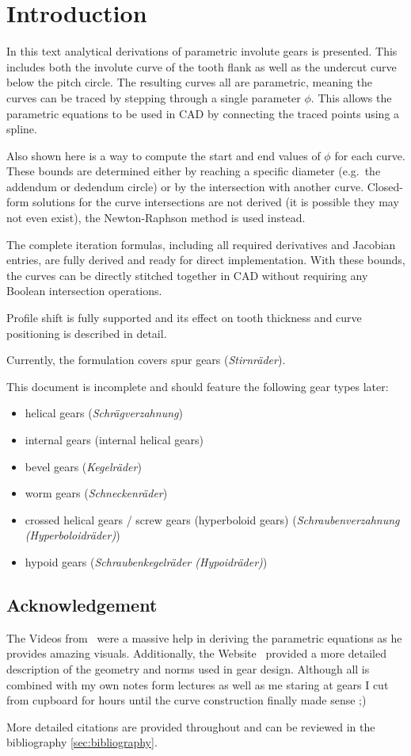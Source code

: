 \section{Introduction}
In this text analytical derivations of parametric involute gears is presented. This includes both the involute curve of the tooth flank as well as the undercut curve below the pitch circle. The resulting curves all are parametric, meaning the curves can be traced by stepping through a single parameter $\phi$. This allows the parametric equations to be used in CAD by connecting the traced points using a spline.

Also shown here is a way to compute the start and end values of $\phi$ for each curve. These bounds are determined either by reaching a specific diameter (e.g.\ the addendum or dedendum circle) or by the intersection with another curve. Closed-form solutions for the curve intersections are not derived (it is possible they may not even exist), the Newton-Raphson method is used instead.

The complete iteration formulas, including all required derivatives and Jacobian entries, are fully derived and ready for direct implementation. With these bounds, the curves can be directly stitched together in CAD without requiring any Boolean intersection operations.

Profile shift is fully supported and its effect on tooth thickness and curve positioning is described in detail.

Currently, the formulation covers spur gears (\textit{Stirnräder}).

This document is incomplete and should feature the following gear types later:
\begin{itemize}
    \item helical gears (\textit{Schrägverzahnung})
    \item internal gears (internal helical gears)
    \item bevel gears (\textit{Kegelräder})
    \item worm gears (\textit{Schneckenräder})
    \item crossed helical gears / screw gears (hyperboloid gears) (\textit{Schraubenverzahnung (Hyperboloidräder)})
    \item hypoid gears (\textit{Schraubenkegelräder (Hypoidräder)})
\end{itemize}

\subsection{Acknowledgement}
The Videos from~\textcite{undercut_profile_shift_YTvideo} were a massive help in deriving the parametric equations as he provides amazing visuals. Additionally, the Website~\textcite{tecScience_zahnstange} provided a more detailed description of the geometry and norms used in gear design. Although all is combined with my own notes form lectures as well as me staring at gears I cut from cupboard for hours until the curve construction finally made sense ;)

More detailed citations are provided throughout and can be reviewed in the bibliography \ref{sec:bibliography}.
